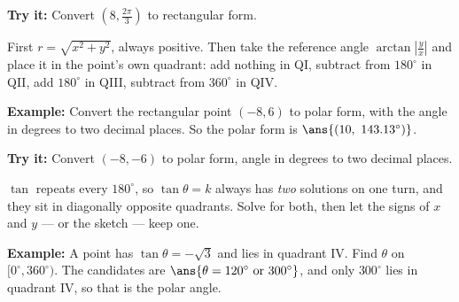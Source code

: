\documentclass[12pt]{article}
\begin{document}
\begin{tryitbox}
\textbf{Try it:} Convert $\left(8, \frac{2\pi}{3}\right)$ to rectangular
form.\\[2pt]
\end{tryitbox}


\begin{formulabox}
First $r = \sqrt{x^2+y^2}$, always positive. Then take the reference angle
$\arctan\left|\frac{y}{x}\right|$ and place it in the point's own quadrant: add
nothing in QI, subtract from $180^\circ$ in QII, add $180^\circ$ in QIII,
subtract from $360^\circ$ in QIV.
\end{formulabox}

\begin{examplebox}
\textbf{Example:} Convert the rectangular point $(-8, 6)$ to polar form, with
the angle in degrees to two decimal places.
So the polar form is $\ans{(10,\ 143.13^\circ)}$.
\end{examplebox}

\begin{tryitbox}
\textbf{Try it:} Convert $(-8, -6)$ to polar form, angle in degrees to two
decimal places.\\[2pt]
\end{tryitbox}


\begin{formulabox}
$\tan$ repeats every $180^\circ$, so $\tan\theta = k$ always has \emph{two}
solutions on one turn, and they sit in diagonally opposite quadrants. Solve for
both, then let the signs of $x$ and $y$ --- or the sketch --- keep one.
\end{formulabox}

\begin{examplebox}
\textbf{Example:} A point has $\tan\theta = -\sqrt{3}$ and lies in quadrant IV.
Find $\theta$ on $[0^\circ, 360^\circ)$.
The candidates are $\ans{\theta = 120^\circ \text{ or } 300^\circ}$, and only
$300^\circ$ lies in quadrant IV, so that is the polar angle.
\end{examplebox}
\end{document}
